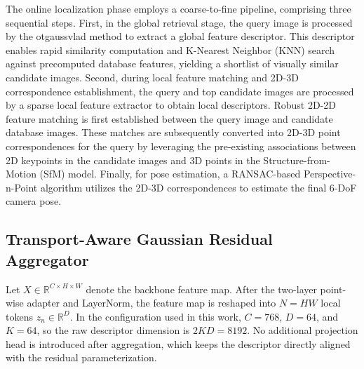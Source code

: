 \documentclass[journal]{IEEEtran}
\begin{document}
The online localization phase employs a coarse-to-fine pipeline, comprising three sequential steps. First, in the global retrieval stage, the query image is processed by the otgaussvlad method to extract a global feature descriptor. This descriptor enables rapid similarity computation and K-Nearest Neighbor (KNN) search against precomputed database features, yielding a shortlist of visually similar candidate images. Second, during local feature matching and 2D-3D correspondence establishment, the query and top candidate images are processed by a sparse local feature extractor to obtain local descriptors. Robust 2D-2D feature matching is first established between the query image and candidate database images. These matches are subsequently converted into 2D-3D point correspondences for the query by leveraging the pre-existing associations between 2D keypoints in the candidate images and 3D points in the Structure-from-Motion (SfM) model. Finally, for pose estimation, a RANSAC-based Perspective-n-Point algorithm utilizes the 2D-3D correspondences to estimate the final 6-DoF camera pose. 



\subsection{Transport-Aware Gaussian Residual Aggregator}
Let \(X \in \mathbb{R}^{C \times H \times W}\) denote the backbone feature map. After the two-layer point-wise adapter and LayerNorm, the feature map is reshaped into \(N = HW\) local tokens \(z_n \in \mathbb{R}^D\). In the configuration used in this work, \(C = 768\), \(D = 64\), and \(K = 64\), so the raw descriptor dimension is \(2KD = 8192\). No additional projection head is introduced after aggregation, which keeps the descriptor directly aligned with the residual parameterization.
\end{document}
